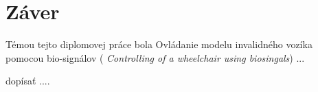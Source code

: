 \chapter*{Záver}  %





\tab[5 mm] Témou tejto diplomovej práce bola Ovládanie modelu invalidného vozíka pomocou bio-signálov (
\textit{Controlling of a wheelchair using biosingals}) ...


dopísať ....